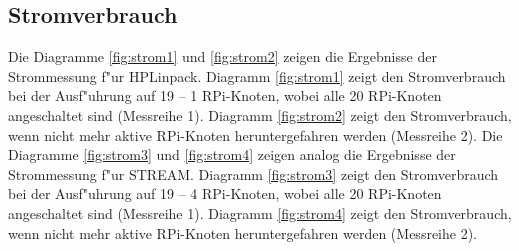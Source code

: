 \subsection{Stromverbrauch}\label{Ergebnisse-Energenie}

Die Diagramme \ref{fig:strom1} und \ref{fig:strom2} zeigen die Ergebnisse der Strommessung f"ur HPLinpack. Diagramm \ref{fig:strom1} zeigt den Stromverbrauch bei der Ausf"uhrung auf 19 -- 1 RPi-Knoten, wobei alle 20 RPi-Knoten angeschaltet sind (Messreihe 1). Diagramm \ref{fig:strom2} zeigt den Stromverbrauch, wenn nicht mehr aktive RPi-Knoten heruntergefahren werden (Messreihe 2). 
\noindent
Die Diagramme \ref{fig:strom3} und \ref{fig:strom4} zeigen analog die Ergebnisse der Strommessung f"ur STREAM. Diagramm \ref{fig:strom3} zeigt den Stromverbrauch bei der Ausf"uhrung auf 19 -- 4 RPi-Knoten, wobei alle 20 RPi-Knoten angeschaltet sind (Messreihe 1). Diagramm \ref{fig:strom4} zeigt den Stromverbrauch, wenn nicht mehr aktive RPi-Knoten heruntergefahren werden (Messreihe 2).
\endinput 


